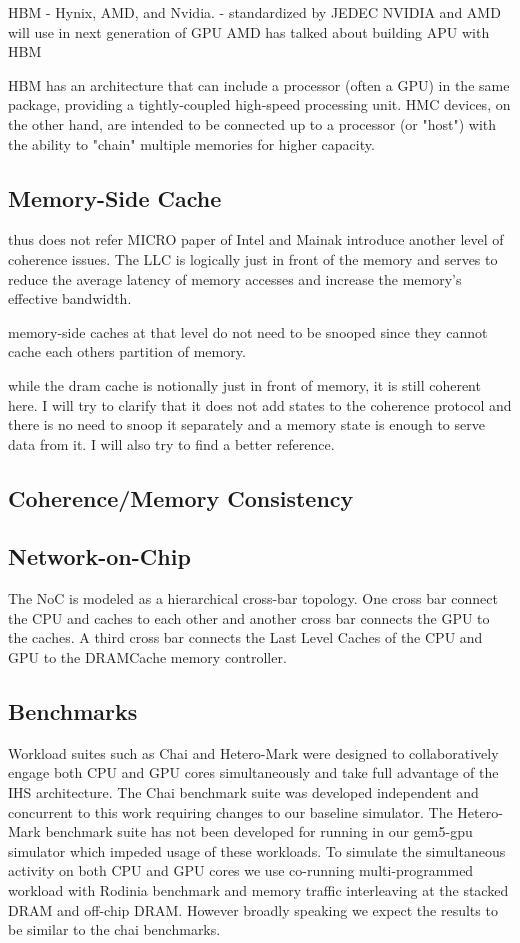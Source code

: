 HBM - Hynix, AMD, and Nvidia. - standardized by JEDEC
NVIDIA and AMD will use in next generation of GPU
AMD has talked about building APU with HBM

HBM has an architecture that can include a processor (often a GPU) in the same package, providing a tightly-coupled high-speed processing unit. HMC devices, on the other hand, are intended to be connected up to a processor (or "host") with the ability to "chain" multiple memories for higher capacity.
\subsection{Memory-Side Cache}
thus does not 
refer MICRO paper of Intel and Mainak
introduce another level of coherence issues. The LLC is logically just in front of the memory and serves 
to reduce the average latency of memory accesses and increase the memory’s effective bandwidth.

memory-side caches at that level do not need to be snooped since they cannot cache each others partition of memory.

while the dram cache is notionally just in front of memory, it is still coherent here. I will try to clarify that it does not add states to the coherence protocol and there is no need to snoop it separately and a memory state is enough to serve data from it. I will also try to find a better reference.
\subsection{Coherence/Memory Consistency}
\subsection{Network-on-Chip}
The NoC is modeled as a hierarchical cross-bar topology. One cross bar connect the CPU and caches to each other and another cross bar connects the GPU to the caches. A third cross bar connects the Last Level Caches of the CPU and GPU to the DRAMCache memory controller.
\subsection{Benchmarks}
Workload suites such as Chai \cite{chai} and Hetero-Mark \cite{hetero-mark} were designed to collaboratively engage both CPU and GPU cores simultaneously and take full advantage of the IHS architecture. The Chai benchmark suite was developed independent and concurrent to this work requiring changes to our baseline simulator.
The Hetero-Mark benchmark suite has not been developed for running in our gem5-gpu simulator which impeded usage of these workloads. To simulate the simultaneous activity on both CPU and GPU cores we use co-running multi-programmed workload with Rodinia benchmark and memory traffic interleaving at the stacked DRAM and off-chip DRAM.
However broadly speaking we expect the results to be similar to the chai benchmarks.
